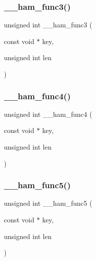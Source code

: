 \subsubsection{\texorpdfstring{\_\_ham\_func3()}{\_\_ham\_func3()}}
{\footnotesize\ttfamily unsigned int \+\_\+\+\_\+ham\+\_\+func3 (\begin{DoxyParamCaption}\item[{const void $\ast$}]{key,  }\item[{unsigned int}]{len }\end{DoxyParamCaption})}

\mbox{\label{adat-devel_2other__libs_2filedb_2filehash_2ffdb__hash__func_8h_a6d9b74fa768ec9e76fc2a0f7dd6d5461}} 
\subsubsection{\texorpdfstring{\_\_ham\_func4()}{\_\_ham\_func4()}}
{\footnotesize\ttfamily unsigned int \+\_\+\+\_\+ham\+\_\+func4 (\begin{DoxyParamCaption}\item[{const void $\ast$}]{key,  }\item[{unsigned int}]{len }\end{DoxyParamCaption})}

\mbox{\label{adat-devel_2other__libs_2filedb_2filehash_2ffdb__hash__func_8h_a81a42d643c836f388d6dc040e4b9b4c6}} 
\subsubsection{\texorpdfstring{\_\_ham\_func5()}{\_\_ham\_func5()}}
{\footnotesize\ttfamily unsigned int \+\_\+\+\_\+ham\+\_\+func5 (\begin{DoxyParamCaption}\item[{const void $\ast$}]{key,  }\item[{unsigned int}]{len }\end{DoxyParamCaption})}



